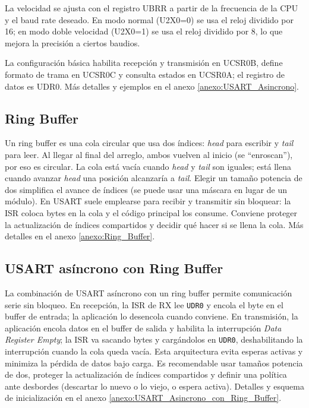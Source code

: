 La velocidad se ajusta con el registro UBRR a partir de la frecuencia de la CPU y el baud rate deseado. En modo normal (U2X0=0) se usa el reloj dividido por 16; en modo doble velocidad (U2X0=1) se usa el reloj dividido por 8, lo que mejora la precisión a ciertos baudios.

La configuración básica habilita recepción y transmisión en UCSR0B, define formato de trama en UCSR0C y consulta estados en UCSR0A; el registro de datos es UDR0. Más detalles y ejemplos en el anexo \ref{anexo:USART_Asincrono}.



\subsection{Ring Buffer}
Un ring buffer es una cola circular que usa dos índices: \textit{head} para escribir y \textit{tail} para leer. Al llegar al final del arreglo, ambos vuelven al inicio (se “enroscan”), por eso es circular. La cola está vacía cuando \textit{head} y \textit{tail} son iguales; está llena cuando avanzar \textit{head} una posición alcanzaría a \textit{tail}. Elegir un tamaño potencia de dos simplifica el avance de índices (se puede usar una máscara en lugar de un módulo). En USART suele emplearse para recibir y transmitir sin bloquear: la ISR coloca bytes en la cola y el código principal los consume. Conviene proteger la actualización de índices compartidos y decidir qué hacer si se llena la cola. Más detalles en el anexo \ref{anexo:Ring_Buffer}.



\subsection{USART asíncrono con Ring Buffer}
La combinación de USART asíncrono con un ring buffer permite comunicación serie sin bloqueo. En recepción, la ISR de RX lee \texttt{UDR0} y encola el byte en el buffer de entrada; la aplicación lo desencola cuando conviene. En transmisión, la aplicación encola datos en el buffer de salida y habilita la interrupción \textit{Data Register Empty}; la ISR va sacando bytes y cargándolos en \texttt{UDR0}, deshabilitando la interrupción cuando la cola queda vacía. Esta arquitectura evita esperas activas y minimiza la pérdida de datos bajo carga. Es recomendable usar tamaños potencia de dos, proteger la actualización de índices compartidos y definir una política ante desbordes (descartar lo nuevo o lo viejo, o espera activa). Detalles y esquema de inicialización en el anexo \ref{anexo:USART_Asincrono_con_Ring_Buffer}.


